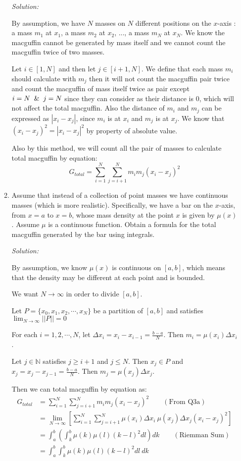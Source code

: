 \documentclass[12pt]{exam}
\newcommand{\N}{\mathbb{N}}
\begin{document}
\begin{enumerate}
\begin{enumerate}
	\emph{Solution:}
	
	By assumption, we have $N$ masses on $N$ different positions on the $x$-axis : a mass $m_1$ at $x_1$, a mass $m_2$ at $x_2$, ..., a mass $m_N$ at $x_N$. We know the macguffin cannot be generated by mass itself and we cannot count the macguffin twice of two masses.
	
	Let $i\in [1, N]$ and then let $j\in [i+1, N]$. We define that each mass $m_i$ should calculate with $m_j$ then it will not count the macguffin pair twice and count the macguffin of mass itself twice as pair except $i=N \And j=N$ since they can consider as their distance is $0$, which will not affect the total macguffin. Also the distance of $m_i$ and $m_j$ can be expressed as $|x_i-x_j|$, since $m_i$ is at $x_i$ and $m_j$ is at $x_j$. We know that $(x_i-x_j)^2=|x_i-x_j|^2$ by property of absolute value.
	
	Also by this method, we will count all the pair of masses to calculate total macguffin by equation:
	$$
	    G_{total}=\sum_{i=1}^{N}\sum_{j=i+1}^{N}m_im_j(x_i-x_j)^2
	$$
	
	\newpage
	
	\item  Assume that instead of a collection of point masses we have continuous masses (which is more realistic).  Specifically, we have a bar on the $x$-axis, from $x=a$ to $x=b$, whose mass density at the point $x$ is given by $\mu(x)$.  Assume $\mu$ is a continuous function.  Obtain a formula for the total macguffin generated by the bar using integrals.
	
	\emph{Solution:}
	
	By assumption, we know $\mu(x)$ is continuous on $[a, b]$, which means that the density may be different at each point and is bounded.
	
	We want $N \to \infty$ in order to divide $[a,b]$.
	
	Let $P=\{x_0,x_1,x_2,\cdots,x_N\}$ be a partition of $[a,b]$ and satisfies $\lim_{N\to\infty}||P||=0$
	
	For each $i=1,2,\cdots,N$, let $\Delta x_i=x_i-x_{i-1}=\frac{b-a}{N}$. Then $m_i=\mu(x_i)\Delta x_i$.
	
	Let $j\in\N$ satisfies $j\geq i+1$ and $j\leq N$. Then $x_j\in P$ and $x_j=x_j-x_{j-1}=\frac{b-a}{N}$. Then $m_j=\mu(x_j)\Delta x_j$.
	
	
	Then we can total macguffin by equation as:
	\begin{align*}
	    G_{total}&=\sum_{i=1}^{N}\sum_{j=i+1}^{N}m_im_j(x_i-x_j)^2\qquad(\mbox{From Q3a})\\
	    &=\lim_{N\to \infty }[\sum_{i=1}^{N}\sum_{j=i+1}^{N}\mu(x_i)\Delta x_i\ \mu(x_j)\Delta x_j(x_i-x_j)^2]\\
	    &=\int_a^b(\int_k^b\mu(k)\mu(l)(k-l)^2dl)dk\qquad(\mbox{Riemman Sum})\\
	    &=\int_a^b\int_k^b\mu(k)\mu(l)(k-l)^2dl\ dk
	\end{align*}
	
\end{enumerate}



\end{enumerate}
\end{document}
